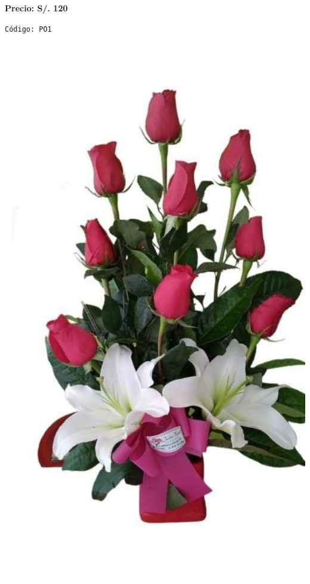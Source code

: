 \documentclass[12pt]{article}
\begin{document}
\vspace{0.3cm}
\begin{center}
   \textbf{\Large Precio: \textcolor[HTML]{228B22}{S/. 120 }}
\end{center}
\begin{center}
    \textcolor[HTML]{191970}{\texttt{Código: PO1}}
\end{center}
\vspace{1cm}
\noindent
\begin{minipage}{0.35\textwidth}
    \includegraphics[width=1.0\textwidth]{imagenes_extraidas/image_9_5}
\end{minipage}
\end{document}
